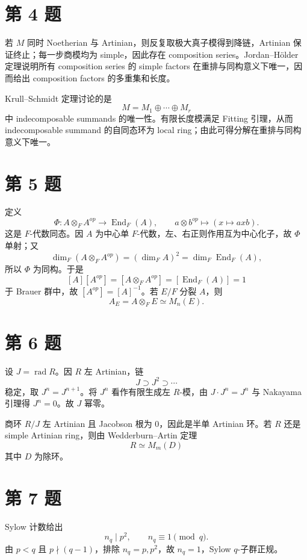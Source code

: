 \documentclass[11pt]{article}
\begin{document}
\section*{第 4 题}

若 \(M\) 同时 Noetherian 与 Artinian，则反复取极大真子模得到降链，Artinian 保证终止；每一步商模均为 simple，因此存在 composition series。Jordan--Hölder 定理说明所有 composition series 的 simple factors 在重排与同构意义下唯一，因而给出 composition factors 的多重集和长度。

Krull--Schmidt 定理讨论的是
\[
  M=M_1\oplus\cdots\oplus M_r
\]
中 indecomposable summands 的唯一性。有限长度模满足 Fitting 引理，从而 indecomposable summand 的自同态环为 local ring；由此可得分解在重排与同构意义下唯一。

\section*{第 5 题}

定义
\[
  \Phi:A\otimes_F A^{op}\longrightarrow \operatorname{End}_F(A),
  \qquad
  a\otimes b^{op}\mapsto (x\mapsto axb).
\]
这是 \(F\)-代数同态。因 \(A\) 为中心单 \(F\)-代数，左、右正则作用互为中心化子，故 \(\Phi\) 单射；又
\[
  \dim_F(A\otimes_F A^{op})=(\dim_F A)^2=\dim_F\operatorname{End}_F(A),
\]
所以 \(\Phi\) 为同构。于是
\[
  [A][A^{op}]=[A\otimes_F A^{op}]=[\operatorname{End}_F(A)]=1
\]
于 Brauer 群中，故 \([A^{op}]=[A]^{-1}\)。若 \(E/F\) 分裂 \(A\)，则
\[
  A_E=A\otimes_F E\simeq M_n(E).
\]

\section*{第 6 题}

设 \(J=\operatorname{rad}R\)。因 \(R\) 左 Artinian，链
\[
  J\supset J^2\supset\cdots
\]
稳定，取 \(J^n=J^{n+1}\)。将 \(J^n\) 看作有限生成左 \(R\)-模，由 \(J\cdot J^n=J^n\) 与 Nakayama 引理得 \(J^n=0\)。故 \(J\) 幂零。

商环 \(R/J\) 左 Artinian 且 Jacobson 根为 \(0\)，因此是半单 Artinian 环。若 \(R\) 还是 simple Artinian ring，则由 Wedderburn--Artin 定理
\[
  R\simeq M_m(D)
\]
其中 \(D\) 为除环。

\section*{第 7 题}

Sylow 计数给出
\[
  n_q\mid p^2,\qquad n_q\equiv1\pmod q.
\]
由 \(p<q\) 且 \(p\nmid(q-1)\)，排除 \(n_q=p,p^2\)，故 \(n_q=1\)，Sylow \(q\)-子群正规。
\end{document}
